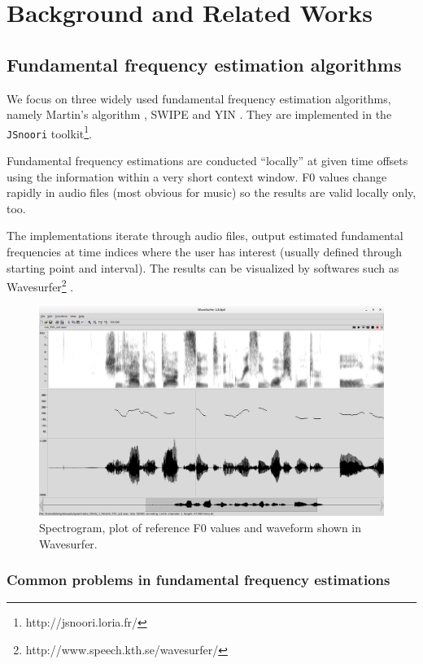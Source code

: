 \documentclass[11pt,a4paper]{report}
\begin{document}
\chapter{Background and Related Works}

\section{Fundamental frequency estimation algorithms}
We focus on three widely used fundamental frequency estimation algorithms, namely Martin's algorithm \parencite{martin1982comparison}, SWIPE \parencite{camacho2007swipe} and YIN \parencite{de2002yin}.
They are implemented in the \texttt{JSnoori} toolkit\footnote{http://jsnoori.loria.fr/}.

Fundamental frequency estimations are conducted \enquote{locally} at given time offsets using the information within a very short context window.
F0 values change rapidly in audio files (most obvious for music) so the results are valid locally only, too.

The implementations iterate through audio files, output estimated fundamental frequencies at time indices where the user has interest (usually defined through starting point and interval).
The results can be visualized by softwares such as Wavesurfer\footnote{http://www.speech.kth.se/wavesurfer/} \parencite{sjolander2000wavesurfer}.

\begin{figure}[htbp]
  \centering
  \includegraphics[width=\textwidth]{wavesurfer.png}
  \caption{Spectrogram, plot of reference F0 values and waveform shown in Wavesurfer.} \label{fig:wavesurfer}
\end{figure}

\subsection{Common problems in fundamental frequency estimations}
\end{document}
